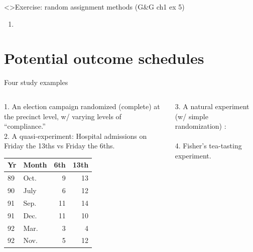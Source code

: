 \begin{frame}<\nottheirhandout>{Exercise: random assignment methods}
{\footnotesize (G\&G ch1 ex 5)}

\begin{enumerate} \addtocounter{enumi}{9}
\item 
{\small 
}
\end{enumerate}
\vfill

\end{frame}


\section{Potential outcome schedules}

\begin{frame}{Four study examples} 


\begin{columns}
\begin{Column}
1. An election campaign randomized (complete) at the precinct level, w/ varying
levels of ``compliance.''\\[2ex]
 2. A quasi-experiment: Hospital admissions on Friday the 13ths vs
Friday the 6ths.\\
{\small
\begin{tabular}{ll|rr} \hline
Yr & Month &	6th &	13th \\ \hline
89 & Oct. &	9 &	13 \\
90 & July &	6 &	12 \\
91 & Sep. &11 &	14 \\
91 & Dec. &	11 &	10 \\
92 & Mar. &	3 &	4 \\
92 & Nov. &	5 &	12 \\ \hline
\end{tabular}
}
\end{Column}
\begin{Column}

3. A natural experiment (w/ simple randomization)%
:
\\
        \\[2ex]

4. Fisher's tea-tasting experiment. 

\end{Column}
\end{columns}

  
\end{frame}


